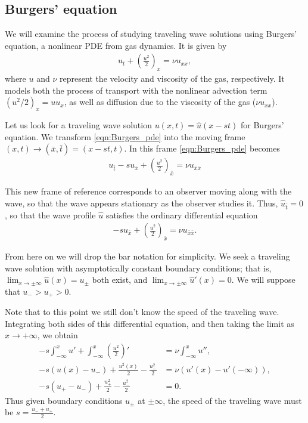 \subsection*{Burgers' equation}
We will examine the process of studying traveling wave solutions using Burgers' equation, a nonlinear PDE from gas dynamics.
It is given by
\begin{align}
	u_t + \left( \frac{u^2}{2} \right)_x = \nu u_{xx},
    \label{eqn:Burgers_pde}
\end{align}
where $u$ and $\nu$ represent the velocity and viscosity of the gas, respectively.
It models both the process of transport with the nonlinear advection term $(u^2/2)_x = u u_x$, as well as diffusion due to the viscosity of the gas ($\nu u_{xx}$).

Let us look for a traveling wave solution $u(x,t) = \hat{u}(x-st)$ for Burgers' equation.
We transform \eqref{eqn:Burgers_pde} into the moving frame $(x,t) \to (\bar{x},\bar{t}) = (x-st, t)$.
In this frame \eqref{eqn:Burgers_pde} becomes
\begin{align*}
	u_{\bar{t}} - s u_{\bar{x}}+ \left(\frac{u^2}{2} \right)_{\bar{x}} = \nu u_{\bar{x}\bar{x}}
\end{align*}

This new frame of reference corresponds to an observer moving along with the wave, so that the wave appears stationary as the observer studies it.
Thus, $\hat{u}_{\bar{t}} = 0$, so that the wave profile $\hat{u}$ satisfies the ordinary differential equation
\begin{align}
	 -s u_{\bar{x}}+ \left(\frac{u^2}{2} \right)_{\bar{x}} = \nu u_{\bar{x}\bar{x}}.
	\label{eqn:Burgers_ode}
\end{align}

From here on we will drop the bar notation for simplicity.
We seek a traveling wave solution with asymptotically constant boundary conditions; that is,  $\lim_{x \to \pm \infty}\hat{u}(x) = u_{\pm}$ both exist, and  $\lim_{x \to \pm \infty} \hat{u}'(x) = 0$.
We will suppose that $u_- > u_+ > 0$.

Note that to this point we still don't know the speed of the traveling wave.
Integrating both sides of this differential equation, and then taking the limit as $x \to +\infty$, we obtain
\begin{align*}
-s\int_{-\infty}^x u' + \int_{-\infty}^x \left(\frac{u^2}{2}\right)' &= \nu \int_{-\infty}^x u'',\\
-s(u(x) - u_-) + \frac{u^2(x)}{2} - \frac{u_-^2}{2} &= \nu (u'(x) - u'(-\infty)), \\
-s(u_+ - u_-) + \frac{u_+^2}{2} - \frac{u_-^2}{2} &= 0.
\end{align*}
Thus given boundary conditions $u_{\pm}$ at $\pm \infty$, the speed of the traveling wave must be $s = \frac{u_- + u_+}{2}$.

